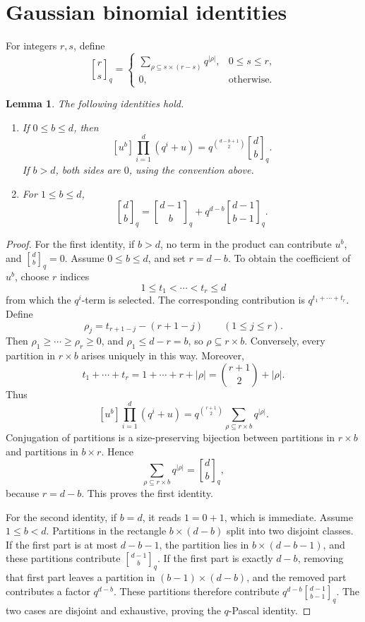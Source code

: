 \documentclass[12pt]{article}
\newtheorem{lemma}[theorem]{Lemma}
\newcommand{\qbinom}[2]{\genfrac{[}{]}{0pt}{}{#1}{#2}_q}
\begin{document}
\section{Gaussian binomial identities}

For integers \(r,s\), define
\[
\qbinom{r}{s}
=
\begin{cases}
\displaystyle \sum_{\rho\subseteq s\times(r-s)}q^{|\rho|},
& 0\le s\le r,\\[1em]
0,
&\text{otherwise.}
\end{cases}
\]

\begin{lemma}\label{lem:gaussian}
The following identities hold.

\begin{enumerate}
\item If \(0\le b\le d\), then
\[
[u^b]\prod_{i=1}^{d}(q^i+u)
=
q^{\binom{d-b+1}{2}}\qbinom{d}{b}.
\]
If \(b>d\), both sides are \(0\), using the convention above.

\item For \(1\le b\le d\),
\[
\qbinom{d}{b}
=
\qbinom{d-1}{b}
+
q^{d-b}\qbinom{d-1}{b-1}.
\]
\end{enumerate}
\end{lemma}

\begin{proof}
For the first identity, if \(b>d\), no term in the product can contribute \(u^b\), and \(\qbinom{d}{b}=0\).  Assume \(0\le b\le d\), and set \(r=d-b\).  To obtain the coefficient of \(u^b\), choose \(r\) indices
\[
1\le t_1<\cdots<t_r\le d
\]
from which the \(q^i\)-term is selected.  The corresponding contribution is \(q^{t_1+\cdots+t_r}\).  Define
\[
\rho_j=t_{r+1-j}-(r+1-j)\qquad (1\le j\le r).
\]
Then \(\rho_1\ge \cdots\ge \rho_r\ge 0\), and \(\rho_1\le d-r=b\), so \(\rho\subseteq r\times b\).  Conversely, every partition in \(r\times b\) arises uniquely in this way.  Moreover,
\[
t_1+\cdots+t_r
=
1+\cdots+r+|\rho|
=
\binom{r+1}{2}+|\rho|.
\]
Thus
\[
[u^b]\prod_{i=1}^{d}(q^i+u)
=
q^{\binom{r+1}{2}}
\sum_{\rho\subseteq r\times b}q^{|\rho|}.
\]
Conjugation of partitions is a size-preserving bijection between partitions in \(r\times b\) and partitions in \(b\times r\).  Hence
\[
\sum_{\rho\subseteq r\times b}q^{|\rho|}
=
\qbinom{d}{b},
\]
because \(r=d-b\).  This proves the first identity.

For the second identity, if \(b=d\), it reads \(1=0+1\), which is immediate.  Assume \(1\le b<d\).  Partitions in the rectangle \(b\times(d-b)\) split into two disjoint classes.  If the first part is at most \(d-b-1\), the partition lies in \(b\times(d-b-1)\), and these partitions contribute \(\qbinom{d-1}{b}\).  If the first part is exactly \(d-b\), removing that first part leaves a partition in \((b-1)\times(d-b)\), and the removed part contributes a factor \(q^{d-b}\).  These partitions therefore contribute \(q^{d-b}\qbinom{d-1}{b-1}\).  The two cases are disjoint and exhaustive, proving the \(q\)-Pascal identity.
\end{proof}
\end{document}
